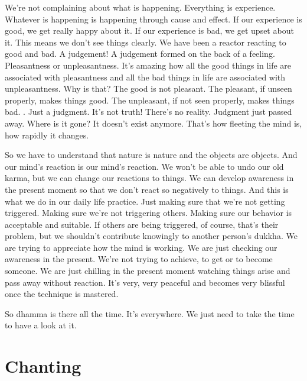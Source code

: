 \documentclass[letterpaper,10pt,english]{sphinxmanual}
\begin{document}
\sphinxAtStartPar
We’re not complaining about what is happening. Everything is experience. Whatever is happening is happening through cause and effect. If our
experience is good, we get really happy about it. If our experience is bad, we
get upset about it. This means we don’t see things clearly. We have been a
reactor reacting to good and bad. A judgement! A judgement formed on the
back of a feeling. Pleasantness or unpleasantness. It’s amazing how all the
good things in life are associated with pleasantness and all the bad things in
life are associated with unpleasantness. Why is that? The good is not pleasant. The  pleasant,  if  unseen  properly,  makes  things  good. The  unpleasant,
if not seen properly, makes things bad.
. Just
a  judgment.  It’s  not  truth!  There’s  no  reality.  Judgment  just  passed  away.
Where is it gone? It doesn’t exist anymore. That’s how fleeting the mind is,
how rapidly it changes.

\sphinxAtStartPar
So  we  have  to  understand  that  nature  is  nature  and  the  objects  are
objects. And our mind’s reaction is our mind’s reaction. We won’t be able
to undo our old karma, but we can change our reactions to things. We can
develop  awareness  in  the  present  moment  so  that  we  don’t  react  so  negatively to things. And this is what we do in our daily life practice. Just making
sure that we’re not getting triggered. Making sure we’re not triggering others.
Making sure our behavior is acceptable and suitable. If others are being triggered, of course, that’s their problem, but we shouldn’t contribute knowingly
to  another  person’s  dukkha.  We  are  trying  to  appreciate  how  the  mind  is
working. We are just checking our awareness in the present. We’re not trying
to achieve, to get or to become someone. We are just chilling in the present
moment watching things arise and pass away without reaction. It’s very, very
peaceful and becomes very blissful once the technique is mastered.

\sphinxAtStartPar
{}  So dhamma is there all the time. It’s everywhere. We just need to take
the time to have a look at it.

\appendix

\sphinxstepscope


\chapter{Chanting}
\label{\detokenize{chanting:chanting}}\label{\detokenize{chanting::doc}}
\end{document}
